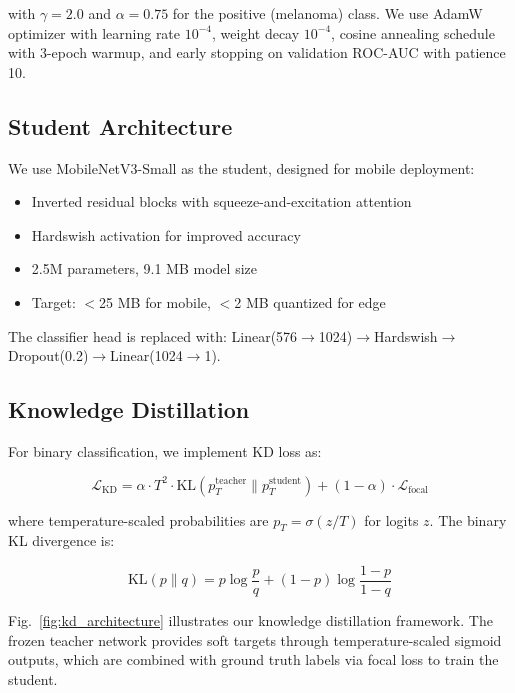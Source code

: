 \documentclass[conference]{IEEEtran}
\begin{document}
with $\gamma=2.0$ and $\alpha=0.75$ for the positive (melanoma) class. We use AdamW optimizer \cite{loshchilov2017decoupled} with learning rate $10^{-4}$, weight decay $10^{-4}$, cosine annealing schedule with 3-epoch warmup, and early stopping on validation ROC-AUC with patience 10.

\subsection{Student Architecture}

We use MobileNetV3-Small \cite{howard2019searching} as the student, designed for mobile deployment:

\begin{itemize}
    \item Inverted residual blocks with squeeze-and-excitation attention
    \item Hardswish activation for improved accuracy
    \item 2.5M parameters, 9.1 MB model size
    \item Target: $<$25 MB for mobile, $<$2 MB quantized for edge
\end{itemize}

The classifier head is replaced with: Linear(576$\rightarrow$1024)$\rightarrow$Hardswish$\rightarrow$Dropout(0.2)$\rightarrow$Linear(1024$\rightarrow$1).

\subsection{Knowledge Distillation}

For binary classification, we implement KD loss as:

\begin{equation}
\mathcal{L}_{\text{KD}} = \alpha \cdot T^2 \cdot \text{KL}(p_T^\text{teacher} \| p_T^\text{student}) + (1-\alpha) \cdot \mathcal{L}_{\text{focal}}
\end{equation}

where temperature-scaled probabilities are $p_T = \sigma(z/T)$ for logits $z$. The binary KL divergence is:

\begin{equation}
\text{KL}(p \| q) = p \log \frac{p}{q} + (1-p) \log \frac{1-p}{1-q}
\end{equation}

Fig.~\ref{fig:kd_architecture} illustrates our knowledge distillation framework. The frozen teacher network provides soft targets through temperature-scaled sigmoid outputs, which are combined with ground truth labels via focal loss to train the student.
\end{document}
